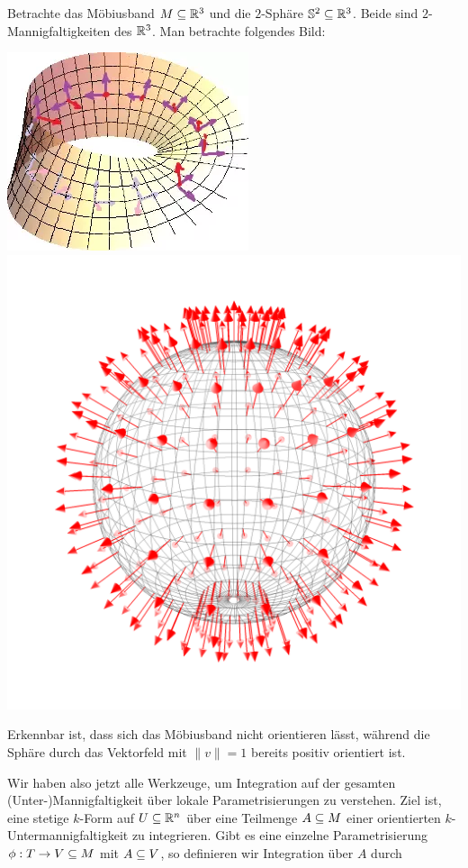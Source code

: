 \begin{beispiel}
Betrachte das Möbiusband $M \subseteq \mathbb{R}^3$ und die $2$-Sphäre $\mathbb{S}^2 \subseteq \mathbb{R}^3$. Beide sind $2$-Mannigfaltigkeiten des $\mathbb{R}^3$. Man betrachte folgendes Bild:\\
\begin{center}
\includegraphics[scale=.3]{figures/mobius.png} 
\includegraphics[scale=.05]{figures/sphere.png}
\end{center}
Erkennbar ist, dass sich das Möbiusband nicht orientieren lässt, während die Sphäre durch das Vektorfeld mit $\|v\|=1$ bereits positiv orientiert ist.
\end{beispiel}
Wir haben also jetzt alle Werkzeuge, um Integration auf der gesamten (Unter-)Mannigfaltigkeit über lokale Parametrisierungen zu verstehen. Ziel ist, eine stetige $k$-Form auf $U \subseteq \mathbb{R}^n$ über eine Teilmenge $A \subseteq M$ einer orientierten $k$-Untermannigfaltigkeit zu integrieren. Gibt es eine einzelne Parametrisierung $\phi: T \to V \sub M$ mit $A \subseteq V$, so definieren wir Integration über $A$ durch
